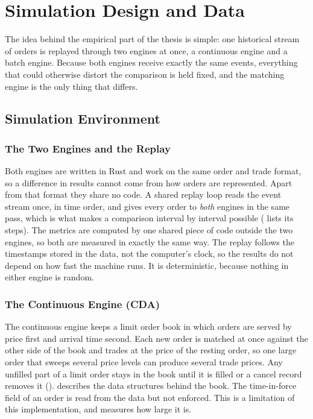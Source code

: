 \chapter{Simulation Design and Data}
\label{ch:simulation}

The idea behind the empirical part of the thesis is simple: one historical
stream of orders is replayed through two engines at once, a continuous
engine and a batch engine.
Because both engines receive exactly the same events, everything that could
otherwise distort the comparison is held fixed, and the matching engine is the
only thing that differs.

\section{Simulation Environment}
\label{sec:environment}

\subsection{The Two Engines and the Replay}

Both engines are written in Rust and work on the same order and trade format,
so a difference in results cannot come from how orders are represented.
Apart from that format they share no code. A shared replay loop reads the
event stream once, in time order, and gives every order to \emph{both}
engines in the same pass, which is what makes a comparison interval by
interval possible ( lists its steps). The metrics are computed by one shared piece of
code outside the two engines, so both are measured in exactly the same way.
The replay follows the timestamps stored in the data, not the computer's
clock, so the results do not depend on how fast the machine runs. It is
deterministic, because nothing in either engine is random.

\subsection{The Continuous Engine (CDA)}

The continuous engine keeps a limit order book in which orders are served by
price first and arrival time second. Each new order is matched at once against
the other side of the book and trades at the price of the resting order, so
one large order that sweeps several price levels can produce several trade
prices. Any unfilled part of a limit order stays in the book until it is
filled or a cancel record removes it ().
 describes the data structures behind the book. The
time-in-force field of an order is read from the data but not enforced.
This is a limitation of this implementation, and 
measures how large it is.

